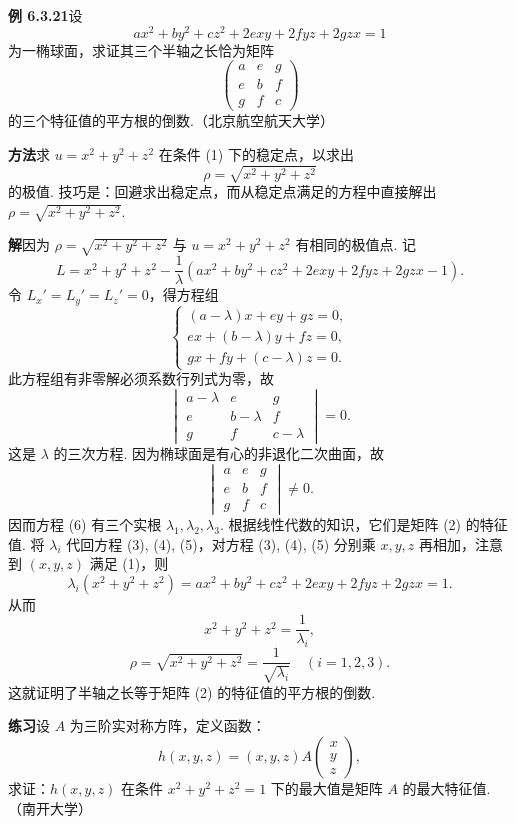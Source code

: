 \documentclass[UTF8,12pt,a4paper,fontset=fandol]{ctexart}
\begin{document}
\noindent\textbf{例 6.3.21}\quad 设
\[
  ax^2+by^2+cz^2+2exy+2fyz+2gzx=1 \tag{1}
\]
为一椭球面，求证其三个半轴之长恰为矩阵
\[
  \begin{pmatrix}
    a&e&g\\
    e&b&f\\
    g&f&c
  \end{pmatrix} \tag{2}
\]
的三个特征值的平方根的倒数.（北京航空航天大学）

\noindent\textbf{方法}\quad 求 $u=x^2+y^2+z^2$ 在条件 (1) 下的稳定点，以求出
\[
  \rho=\sqrt{x^2+y^2+z^2}
\]
的极值. 技巧是：回避求出稳定点，而从稳定点满足的方程中直接解出 $\rho=\sqrt{x^2+y^2+z^2}$.

\noindent\textbf{解}\quad 因为 $\rho=\sqrt{x^2+y^2+z^2}$ 与 $u=x^2+y^2+z^2$ 有相同的极值点. 记
\[
  L=x^2+y^2+z^2-\frac1{\lambda}
  (ax^2+by^2+cz^2+2exy+2fyz+2gzx-1).
\]
令 $L_x'=L_y'=L_z'=0$，得方程组
\[
  \begin{cases}
    (a-\lambda)x+ey+gz=0,\\
    ex+(b-\lambda)y+fz=0,\\
    gx+fy+(c-\lambda)z=0.
  \end{cases} \tag{3--5}
\]
此方程组有非零解必须系数行列式为零，故
\[
  \begin{vmatrix}
    a-\lambda&e&g\\
    e&b-\lambda&f\\
    g&f&c-\lambda
  \end{vmatrix}=0. \tag{6}
\]
这是 $\lambda$ 的三次方程. 因为椭球面是有心的非退化二次曲面，故
\[
  \begin{vmatrix}
    a&e&g\\
    e&b&f\\
    g&f&c
  \end{vmatrix}\ne0.
\]
因而方程 (6) 有三个实根 $\lambda_1,\lambda_2,\lambda_3$. 根据线性代数的知识，它们是矩阵 (2) 的特征值. 将 $\lambda_i$ 代回方程 (3), (4), (5)，对方程 (3), (4), (5) 分别乘 $x,y,z$ 再相加，注意到 $(x,y,z)$ 满足 (1)，则
\[
  \lambda_i(x^2+y^2+z^2)=
  ax^2+by^2+cz^2+2exy+2fyz+2gzx=1.
\]
从而
\[
  x^2+y^2+z^2=\frac1{\lambda_i},
\]
\[
  \rho=\sqrt{x^2+y^2+z^2}=\frac1{\sqrt{\lambda_i}}
  \quad(i=1,2,3).
\]
这就证明了半轴之长等于矩阵 (2) 的特征值的平方根的倒数.

\noindent\textbf{练习}\quad 设 $A$ 为三阶实对称方阵，定义函数：
\[
  h(x,y,z)=(x,y,z)A
  \begin{pmatrix}
    x\\y\\z
  \end{pmatrix},
\]
求证：$h(x,y,z)$ 在条件 $x^2+y^2+z^2=1$ 下的最大值是矩阵 $A$ 的最大特征值.（南开大学）
\end{document}
